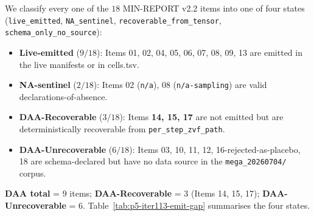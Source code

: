 We classify every one of the $18$ MIN-REPORT v2.2 items into one of
four states (\texttt{live\_emitted}, \texttt{NA\_sentinel},
\texttt{recoverable\_from\_tensor}, \texttt{schema\_only\_no\_source}):
\begin{itemize}
  \item \textbf{Live-emitted} ($9/18$): Items 01, 02, 04, 05, 06, 07,
        08, 09, 13 are emitted in the live manifests or in cells.tsv.
  \item \textbf{NA-sentinel} ($2/18$): Items 02 (\texttt{n/a}), 08
        (\texttt{n/a-sampling}) are valid declarations-of-absence.
  \item \textbf{DAA-Recoverable} ($3/18$): Items \textbf{14, 15, 17}
        are not emitted but are deterministically recoverable from
        \texttt{per\_step\_zvf\_path}.
  \item \textbf{DAA-Unrecoverable} ($6/18$): Items 03, 10, 11, 12,
        16-rejected-as-placebo, 18 are schema-declared but have no
        data source in the \texttt{mega\_20260704/} corpus.
\end{itemize}
\textbf{DAA total} = $9$ items; \textbf{DAA-Recoverable} = $3$
(Items 14, 15, 17); \textbf{DAA-Unrecoverable} = $6$.
Table~\ref{tab:p5-iter113-emit-gap} summarises the four states.

\begin{table}[ht]
\centering
\small
\caption{P5 MIN-REPORT v2.2 $\times$ live-manifest $\times$ recovery
classification ($n{=}98$ manifests, $n{=}18$ schema items). The
\textbf{3 DAA-Recoverable items} (14, 15, 17) are signal-bearing per
iter-81 row 96 and can be back-filled from \texttt{per\_step\_zvf\_path}
at zero harvest cost. The $6$ DAA-Unrecoverable items have no source in
the \texttt{mega\_20260704/} corpus.}
\label{tab:p5-iter113-emit-gap}
\end{table}

